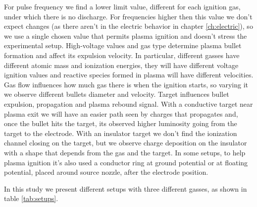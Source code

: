 For pulse frequency we find a lower limit value, different for each ignition gas, under which there is no discharge. For frequencies higher then this value we don't expect changes (as there aren't in the electric behavior in chapter \ref{ch:electric}), so we use a single chosen value that permits plasma ignition and doesn't stress the experimental setup.
High-voltage values and gas type determine plasma bullet formation and affect its expulsion velocity. In particular, different gasses have different atomic mass and ionization energies, they will have different voltage ignition values and reactive species formed in plasma will have different velocities.
Gas flow influences how much gas there is when the ignition starts, so varying it we observe different bullets diameter and velocity.
Target influences bullet expulsion, propagation and plasma rebound signal. With a conductive target near plasma exit we will have an easier path seen by charges that propagates and, once the bullet hits the target, its observed higher luminosity going from the target to the electrode. With an insulator target we don't find the ionization channel closing on the target, but we observe charge deposition on the insulator with a shape that depends from the gas and the target.
In some setups, to help plasma ignition it's also used a conductor ring at ground potential or at floating potential, placed around source nozzle, after the electrode position.


In this study we present different setups with three different gasses, as shown in table \ref{tab:setups}.

